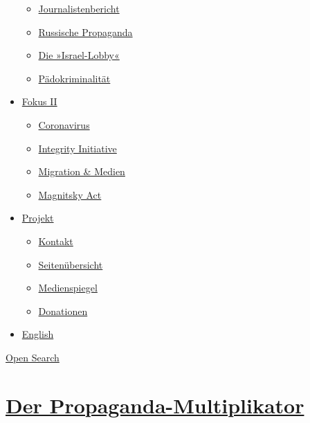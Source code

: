 \begin{itemize}
  \begin{itemize}
  \tightlist
  \item
    \href{https://swprs.org/bericht-eines-journalisten/}{Journalistenbericht}
  \item
    \href{https://swprs.org/russische-propaganda/}{Russische Propaganda}
  \item
    \href{https://swprs.org/die-israel-lobby-fakten-und-mythen/}{Die
    »Israel-Lobby«}
  \item
    \href{https://swprs.org/geopolitik-und-paedokriminalitaet/}{Pädokriminalität}
  \end{itemize}
\item
  \href{https://swprs.org/migration-und-medien/}{Fokus II}

  \begin{itemize}
  \tightlist
  \item
    \href{https://swprs.org/covid-19-hinweis-ii/}{Coronavirus}
  \item
    \href{https://swprs.org/die-integrity-initiative/}{Integrity
    Initiative}
  \item
    \href{https://swprs.org/migration-und-medien/}{Migration \& Medien}
  \item
    \href{https://swprs.org/der-fall-magnitsky/}{Magnitsky Act}
  \end{itemize}
\item
  \href{https://swprs.org/kontakt/}{Projekt}

  \begin{itemize}
  \tightlist
  \item
    \href{https://swprs.org/kontakt/}{Kontakt}
  \item
    \href{https://swprs.org/uebersicht/}{Seitenübersicht}
  \item
    \href{https://swprs.org/medienspiegel/}{Medienspiegel}
  \item
    \href{https://swprs.org/donationen/}{Donationen}
  \end{itemize}
\item
  \href{https://swprs.org/contact/}{English}
\end{itemize}

\protect\hyperlink{}{Open Search}

\hypertarget{der-propaganda-multiplikator}{%
\section{\texorpdfstring{\href{https://swprs.org/2017/03/01/propaganda-multiplikator/}{Der
Propaganda-Multiplikator}}{Der Propaganda-Multiplikator}}\label{der-propaganda-multiplikator}}

